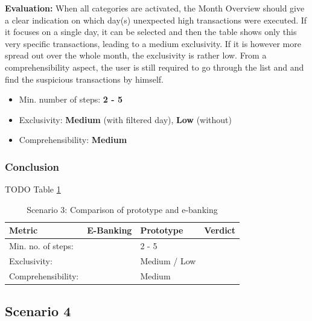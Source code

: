 \textbf{Evaluation:} When all categories are activated, the Month Overview should give a clear indication on which day(s) unexpected high transactions were executed. If it focuses on a single day, it can be selected and then the table shows only this very specific transactions, leading to a medium exclusivity. If it is however more spread out over the whole month, the exclusivity is rather low. From a comprehensibility aspect, the user is still required to go through the list and and find the suspicious transactions by himself.
\begin{itemize}[noitemsep,nolistsep]
	\item Min. number of steps: \textbf{2 - 5}
	\item Exclusivity: \textbf{Medium} (with filtered day), \textbf{Low} (without)
	\item Comprehensibility: \textbf{Medium}
\end{itemize}



\subsubsection{Conclusion}

TODO Table \ref{tbl:scenariothreecomparison}

\begin{table}[t]
	\begin{center}
		\begin{tabular}{ | p{3.2cm} | p{3.8cm} | p{3.5cm} | p{2.5cm} | }
			\hline
			\textbf{Metric} & \textbf{E-Banking} & \textbf{Prototype} & \textbf{Verdict} \\
			\hline
			Min. no. of steps: &  & 2 - 5 &  \\
			\hline
			Exclusivity: &  & Medium / Low &  \\
			\hline
			Comprehensibility: &  & Medium &  \\
			\hline
		\end{tabular}
		\caption{Scenario 3: Comparison of prototype and e-banking}
		\label{tbl:scenariothreecomparison}
	\end{center}
\end{table}



\subsection{Scenario 4}


